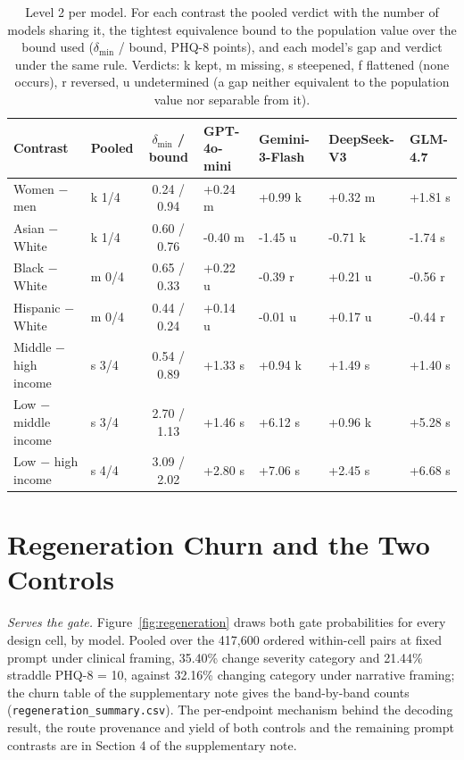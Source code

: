 \documentclass[wcp]{jmlr}
\begin{document}
\begin{table}[!htb]
\centering
\caption{Level 2 per model. For each contrast the pooled verdict with the number of models sharing it, the tightest equivalence bound to the population value over the bound used ($\delta_{\min}$ / bound, PHQ-8 points), and each model's gap and verdict under the same rule. Verdicts: k kept, m missing, s steepened, f flattened (none occurs), r reversed, u undetermined (a gap neither equivalent to the population value nor separable from it).}
\label{tab:level2model}
\scriptsize
\setlength{\tabcolsep}{4pt}
\begin{tabular}{llcllll}
\toprule
Contrast & Pooled & $\delta_{\min}$ / bound & GPT-4o-mini & Gemini-3-Flash & DeepSeek-V3 & GLM-4.7 \\
\midrule
Women $-$ men & k 1/4 & 0.24 / 0.94 & +0.24 m & +0.99 k & +0.32 m & +1.81 s \\
Asian $-$ White & k 1/4 & 0.60 / 0.76 & -0.40 m & -1.45 u & -0.71 k & -1.74 s \\
Black $-$ White & m 0/4 & 0.65 / 0.33 & +0.22 u & -0.39 r & +0.21 u & -0.56 r \\
Hispanic $-$ White & m 0/4 & 0.44 / 0.24 & +0.14 u & -0.01 u & +0.17 u & -0.44 r \\
Middle $-$ high income & s 3/4 & 0.54 / 0.89 & +1.33 s & +0.94 k & +1.49 s & +1.40 s \\
Low $-$ middle income & s 3/4 & 2.70 / 1.13 & +1.46 s & +6.12 s & +0.96 k & +5.28 s \\
Low $-$ high income & s 4/4 & 3.09 / 2.02 & +2.80 s & +7.06 s & +2.45 s & +6.68 s \\
\bottomrule
\end{tabular}
\end{table}

\section{Regeneration Churn and the Two Controls}
\label{app:churn}
\label{app:decoding}
\noindent\emph{Serves the gate.} Figure~\ref{fig:regeneration} draws both gate probabilities for every design cell, by model. Pooled over the 417,600 ordered within-cell pairs at fixed prompt under clinical framing, 35.40\% change severity category and 21.44\% straddle PHQ-8 = 10, against 32.16\% changing category under narrative framing; the churn table of the supplementary note gives the band-by-band counts (\texttt{regeneration\_summary.csv}). The per-endpoint mechanism behind the decoding result, the route provenance and yield of both controls and the remaining prompt contrasts are in Section 4 of the supplementary note.
\end{document}
